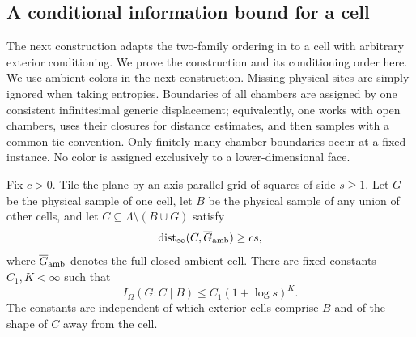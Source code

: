 \subsection{A conditional information bound for a cell}

The next construction adapts the two-family ordering in
\cite[Section~11]{RepoAreaLaw} to a cell with arbitrary exterior conditioning.
We prove the construction and its conditioning order here.
We use ambient colors in the next construction.  Missing physical sites
are simply ignored when taking entropies.  Boundaries of all chambers
are assigned by one consistent infinitesimal generic displacement;
equivalently, one works with open chambers, uses their closures for
distance estimates, and then samples with a common tie convention.
Only finitely many chamber boundaries occur at a fixed instance.  No
color is assigned exclusively to a lower-dimensional face.

\begin{lemma}
\label{lem:cell-cmi}
Fix $c>0$.  Tile the plane by an axis-parallel grid of squares of side
$s\ge1$.  Let $G$ be the physical sample of one cell, let $B$ be the
physical sample of any union of other cells, and let
$C\subseteq\Lambda\setminus(B\cup G)$ satisfy
\[
 \operatorname{dist}_\infty(C,\overline{G}_{\rm amb})\ge cs,
\]
where $\overline{G}_{\rm amb}$ denotes the full closed ambient cell.
There are fixed constants $C_1,K<\infty$ such that
\begin{equation}
 I_\Omega(G:C\mid B)\le C_1(1+\log s)^K.
 \label{eq:info-cell-cmi}
\end{equation}
The constants are independent of which exterior cells comprise $B$
and of the shape of $C$ away from the cell.
\end{lemma}

